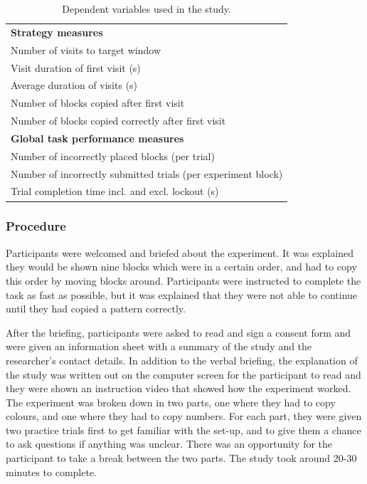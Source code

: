 \begin{table}[htp]
\centering
    \begin{tabular}{  l }
    \hline
    \textbf{ Strategy measures} \\  
    Number of visits to target window  \\ 
    Visit duration of first visit (s)  \\
    Average duration of visits (s) \\
    Number of blocks copied after first visit \\
    Number of blocks copied correctly after first visit 
    
    \vspace{10pt} \\
    
\textbf{Global task performance measures} \\ 
Number of incorrectly placed blocks (per trial) \\
Number of incorrectly submitted trials (per experiment block) \\
Trial completion time incl. and excl. lockout (s) \\ \hline
    \end{tabular}
    \caption[Study 3 dependent variables]{Dependent variables used in the study.}
    \label{table:ch4_dvs}
\end{table}

\subsubsection{Procedure}
Participants were welcomed and briefed about the experiment. It was explained they would be shown nine blocks which were in a certain order, and had to copy this order by moving blocks around. Participants were instructed to complete the task as fast as possible, but it was explained that they were not able to continue until they had copied a pattern correctly. 

After the briefing, participants were asked to read and sign a consent form and were given an information sheet with a summary of the study and the researcher's contact details. In addition to the verbal briefing, the explanation of the study was written out on the computer screen for the participant to read and they were shown an instruction video that showed how the experiment worked. 
The experiment was broken down in two parts, one where they had to copy colours, and one where they had to copy numbers. For each part, they were given two practice trials first to get familiar with the set-up, and to give them a chance to ask questions if anything was unclear. There was an opportunity for the participant to take a break between the two parts. The study took around 20-30 minutes to complete.

